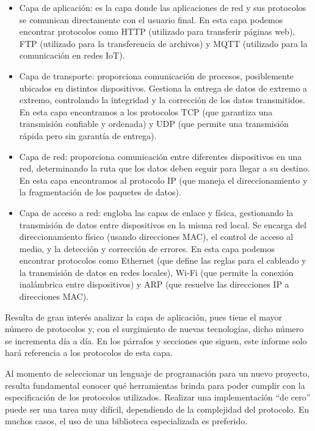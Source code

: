 \documentclass[11pt]{article}
\begin{document}
\begin{itemize} %
    \item Capa de aplicación: es la capa donde las aplicaciones de red y sus protocolos se comunican directamente con el usuario final. En esta capa podemos encontrar protocolos como HTTP (utilizado para transferir páginas web), FTP (utilizado para la transferencia de archivos) y MQTT (utilizado para la comunicación en redes IoT).
    \item Capa de transporte: proporciona comunicación de procesos, posiblemente ubicados en distintos dispositivos. Gestiona la entrega de datos de extremo a extremo, controlando la integridad y la corrección de los datos transmitidos. En esta capa encontramos a los protocolos TCP (que garantiza una transmisión confiable y ordenada) y UDP (que permite una transmisión rápida pero sin garantía de entrega).
    \item Capa de red: proporciona comunicación entre diferentes dispositivos en una red, determinando la ruta que los datos deben seguir para llegar a su destino. En esta capa encontramos al protocolo IP (que maneja el direccionamiento y la fragmentación de los paquetes de datos).
    \item Capa de acceso a red: engloba las capas de enlace y física, gestionando la transmisión de datos entre dispositivos en la misma red local. Se encarga del direccionamiento físico (usando direcciones MAC), el control de acceso al medio, y la detección y corrección de errores. En esta capa podemos encontrar protocolos como Ethernet (que define las reglas para el cableado y la transmisión de datos en redes locales), Wi-Fi (que permite la conexión inalámbrica entre dispositivos) y ARP (que resuelve las direcciones IP a direcciones MAC).
\end{itemize}

Resulta de gran interés analizar la capa de aplicación, pues tiene el mayor número de protocolos y, con el surgimiento de nuevas tecnologías, dicho número se incrementa día a día. En los párrafos y secciones que siguen, este informe solo hará referencia a los protocolos de esta capa. %

Al momento de seleccionar un lenguaje de programación para un nuevo proyecto, resulta fundamental conocer qué herramientas brinda para poder cumplir con la especificación de los protocolos utilizados. Realizar una implementación ``de cero'' puede ser una tarea muy difícil, dependiendo de la complejidad del protocolo. En muchos casos, el uso de una biblioteca especializada es preferido.
\end{document}

